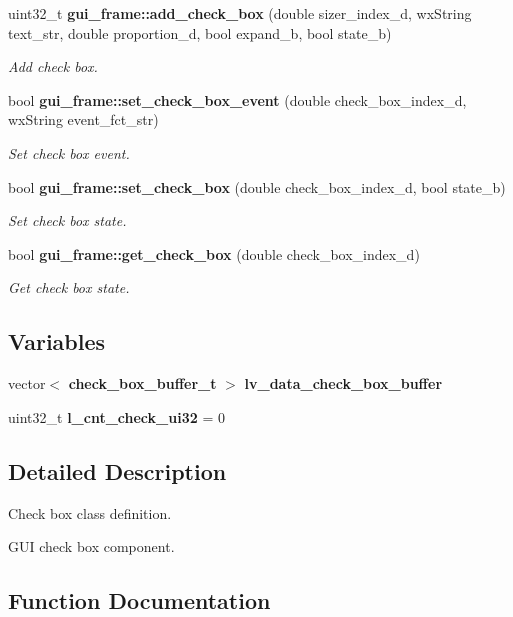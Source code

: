 \begin{DoxyCompactItemize}
uint32\+\_\+t \textbf{ gui\+\_\+frame\+::add\+\_\+check\+\_\+box} (double sizer\+\_\+index\+\_\+d, wx\+String text\+\_\+str, double proportion\+\_\+d, bool expand\+\_\+b, bool state\+\_\+b)
\begin{DoxyCompactList}\small\item\em Add check box. \end{DoxyCompactList}\item 
bool \textbf{ gui\+\_\+frame\+::set\+\_\+check\+\_\+box\+\_\+event} (double check\+\_\+box\+\_\+index\+\_\+d, wx\+String event\+\_\+fct\+\_\+str)
\begin{DoxyCompactList}\small\item\em Set check box event. \end{DoxyCompactList}\item 
bool \textbf{ gui\+\_\+frame\+::set\+\_\+check\+\_\+box} (double check\+\_\+box\+\_\+index\+\_\+d, bool state\+\_\+b)
\begin{DoxyCompactList}\small\item\em Set check box state. \end{DoxyCompactList}\item 
bool \textbf{ gui\+\_\+frame\+::get\+\_\+check\+\_\+box} (double check\+\_\+box\+\_\+index\+\_\+d)
\begin{DoxyCompactList}\small\item\em Get check box state. \end{DoxyCompactList}\end{DoxyCompactItemize}
\subsection*{Variables}
\begin{DoxyCompactItemize}
\item 
vector$<$ \textbf{ check\+\_\+box\+\_\+buffer\+\_\+t} $>$ \textbf{ lv\+\_\+data\+\_\+check\+\_\+box\+\_\+buffer}
\item 
\mbox{\label{group___check__box_gaaadd6b00911e90faea6e98b0f0bdad62}} 
uint32\+\_\+t {\bfseries l\+\_\+cnt\+\_\+check\+\_\+ui32} = 0
\end{DoxyCompactItemize}


\subsection{Detailed Description}
Check box class definition. 

G\+UI check box component.

\subsection{Function Documentation}
\mbox{\label{group___check__box_ga4587360ac64349d1b7d36b4caf9031a7}} 
